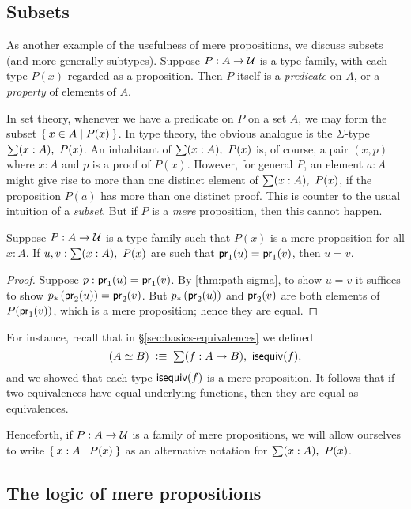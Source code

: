 \subsection{Subsets}
\label{subsec:prop-subsets}

As another example of the usefulness of mere propositions, we discuss subsets (and more generally subtypes).
Suppose $P:A\to\mathcal{U}$ is a type family, with each type $P(x)$ regarded as a proposition.
Then $P$ itself is a \emph{predicate} on $A$, or a \emph{property} of elements of $A$.

In set theory, whenever we have a predicate on $P$ on a set $A$, we may form the subset $\Set{x\in A | P(x)}$.
In type theory, the obvious analogue is the $\Sigma$-type $\sm{x:A} P(x)$.
An inhabitant of $\sm{x:A} P(x)$ is, of course, a pair $(x,p)$ where $x:A$ and $p$ is a proof of $P(x)$.
However, for general $P$, an element $a:A$ might give rise to more than one distinct element of $\sm{x:A} P(x)$, if the proposition $P(a)$ has more than one distinct proof.
This is counter to the usual intuition of a \emph{subset}.
But if $P$ is a \emph{mere} proposition, then this cannot happen.

\begin{lem}
  Suppose $P:A\to\mathcal{U}$ is a type family such that $P(x)$ is a mere proposition for all $x:A$.
  If $u,v:\sm{x:A} P(x)$ are such that $\mathsf{pr}_{1}(u) = \mathsf{pr}_{1}(v)$, then $u=v$.
\end{lem}
\begin{proof}
  Suppose $p:\mathsf{pr}_{1}(u) = \mathsf{pr}_{1}(v)$.
  By \autoref{thm:path-sigma}, to show $u=v$ it suffices to show ${p}_{*}\left({\mathsf{pr}_{2}(u)}\right) = \mathsf{pr}_{2}(v)$.
  But ${p}_{*}\left({\mathsf{pr}_{2}(u)}\right)$ and $\mathsf{pr}_{2}(v)$ are both elements of $P(\mathsf{pr}_{1}(v))$, which is a mere proposition; hence they are equal.
\end{proof}

For instance, recall that in \S\ref{sec:basics-equivalences} we defined
\[(\eqv A B) \;\defeq\; \sm{f:A\to B} \isequiv (f),\]
and we showed that each type $\mathsf{isequiv} (f)$ is a mere proposition.
It follows that if two equivalences have equal underlying functions, then they are equal as equivalences.

Henceforth, if $P:A\to \mathcal{U}$ is a family of mere propositions, we will allow ourselves to write $\Set{x:A | P(x)}$ as an alternative notation for $\sm{x:A} P(x)$.


\subsection{The logic of mere propositions}
\label{subsec:logic-hprop}

